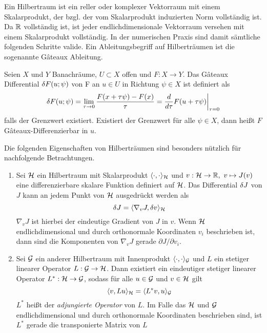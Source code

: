 Ein Hilbertraum ist ein reller oder komplexer Vektorraum mit einem Skalarprodukt, der bzgl. der vom Skalarprodukt induzierten Norm vollständig ist. Da $\mathbb{R}$ vollständig ist, ist jeder endlichdimensionale Vektorraum versehen mit einem Skalarprodukt vollständig. In der numerischen Praxis sind damit sämtliche folgenden Schritte valide. 
Ein Ableitungsbegriff auf Hilberträumen ist die sogenannte Gâteaux Ableitung.
\begin{definition}
 Seien $X$ und $Y$ Banachräume, $U \subset X$ offen und $F:X\to Y$. Das Gâteaux Differential $\delta F(u;\psi)$ von F an $u\in U$ in Richtung $\psi\in X$ ist definiert als
 \[
  \delta F(u;\psi) = \lim_{\tau \to 0} \frac{F(x+\tau \psi) - F(x)}{\tau} = \frac{d}{d\tau} F(u+\tau\psi)\biggr\rvert_{\tau = 0}
 \]
 falls der Grenzwert existiert. Existiert der Grenzwert für alle $\psi\in X$, dann heißt $F$ Gâteaux-Differenzierbar in $u$.
\end{definition}
Die folgenden Eigenschaften von Hilberträumen sind besonders nützlich für nachfolgende Betrachtungen.
\begin{proposition}
\label{prop:adjoints}
\begin{enumerate}
 \item Sei $\mathcal{H}$ ein Hilbertraum mit Skalarprodukt $\langle \cdot,\cdot \rangle_{\mathcal{H}}$ und $v:\mathcal{H} \to \mathbb{R},~ v\mapsto J(v)$ eine differenzierbare skalare Funktion definiert auf $\mathcal{H}$. Das Differential $\delta J$ von $J$ kann an jedem Punkt von $\mathcal{H}$ ausgedrückt werden als
 \begin{equation}
 \label{eq:diffInnerProduct}
  \delta J = \langle \nabla_v J, \delta v\rangle_{\mathcal{H}}
 \end{equation}
 $\nabla_v J$ ist hierbei der eindeutige Gradient von $J$ in $v$. Wenn $\mathcal{H}$ endlichdimensional und durch orthonormale Koordinaten $v_i$ beschrieben ist, dann sind die Komponenten von $\nabla_v J$ gerade $\partial J/\partial v_i$.
\item Sei $\mathcal{G}$ ein anderer Hilbertraum mit Innenprodukt $\langle \cdot,\cdot \rangle_{\mathcal{G}}$ und $L$ ein stetiger linearer Operator $L:\mathcal{G}\to \mathcal{H}$. Dann existiert ein eindeutiger stetiger linearer Operator $L^*:\mathcal{H}\to\mathcal{G}$, sodass für alle $u\in \mathcal{G}$ und $v\in \mathcal{H}$ gilt
\begin{equation}
\label{eq:adjointInnerProduct}
\langle v,Lu\rangle_{\mathcal{H}} =  \langle L^*v,u \rangle_{\mathcal{G}}
\end{equation}
$L^*$ heißt der \textit{adjungierte Operator} von $L$. Im Falle das $\mathcal{H}$ und $\mathcal{G}$ endlichdimensional und durch orthonormale Koordinaten beschrieben sind, ist $L^*$ gerade die transponierte Matrix von $L$
\end{enumerate} 
\end{proposition}

